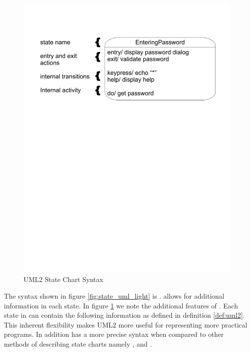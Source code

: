 \begin{figure}[htp]
    \centering
    \includegraphics[trim= 15mm 175mm 15mm 10mm, clip, width=\imgmedium]{./images/state_uml2_syntax_21_4.pdf} 
    \caption{UML2 State Chart Syntax \cite{UML2}}
    \label{fig:state_uml2}
\end{figure}

The syntax shown in figure \ref{fig:state_uml_light} is \cite{UML2}. \cite{UML2} allows for additional information in each state. In figure \ref{fig:state_uml2} we note the additional features of \cite{UML2}. Each state in \cite{UML2} can contain the following information as defined in definition \ref{def:uml2}. This inherent flexibility makes UML2 more useful for representing more practical programs. In addition \cite{UML2} has a more precise syntax when compared to other methods of describing state charts namely \cite{StateChartVis}, and \cite{uml2}.


